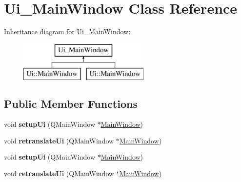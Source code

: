 \hypertarget{class_ui___main_window}{}\section{Ui\+\_\+\+Main\+Window Class Reference}
\label{class_ui___main_window}
Inheritance diagram for Ui\+\_\+\+Main\+Window\+:\begin{figure}[H]
\begin{center}
\leavevmode
\includegraphics[height=2.000000cm]{class_ui___main_window}
\end{center}
\end{figure}
\subsection*{Public Member Functions}
\begin{DoxyCompactItemize}
\item 
\hypertarget{class_ui___main_window_acf4a0872c4c77d8f43a2ec66ed849b58}{}void {\bfseries setup\+Ui} (Q\+Main\+Window $\ast$\hyperlink{class_main_window}{Main\+Window})\label{class_ui___main_window_acf4a0872c4c77d8f43a2ec66ed849b58}

\item 
\hypertarget{class_ui___main_window_a097dd160c3534a204904cb374412c618}{}void {\bfseries retranslate\+Ui} (Q\+Main\+Window $\ast$\hyperlink{class_main_window}{Main\+Window})\label{class_ui___main_window_a097dd160c3534a204904cb374412c618}

\item 
\hypertarget{class_ui___main_window_acf4a0872c4c77d8f43a2ec66ed849b58}{}void {\bfseries setup\+Ui} (Q\+Main\+Window $\ast$\hyperlink{class_main_window}{Main\+Window})\label{class_ui___main_window_acf4a0872c4c77d8f43a2ec66ed849b58}

\item 
\hypertarget{class_ui___main_window_a097dd160c3534a204904cb374412c618}{}void {\bfseries retranslate\+Ui} (Q\+Main\+Window $\ast$\hyperlink{class_main_window}{Main\+Window})\label{class_ui___main_window_a097dd160c3534a204904cb374412c618}

\end{DoxyCompactItemize}
